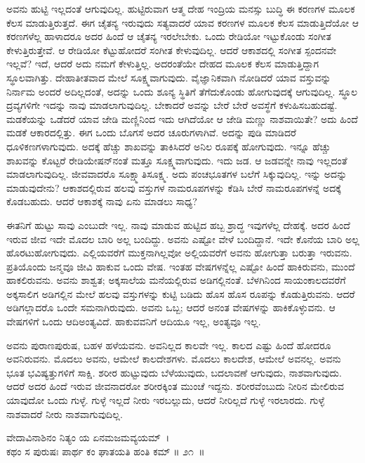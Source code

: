ಅವನು ಹುಟ್ಟಿ ಇಲ್ಲದಂತೆ ಆಗುವುದಿಲ್ಲ. ಹುಟ್ಟಿರುವಾಗ ಆತ್ಮ ದೇಹ ಇಂದ್ರಿಯ ಮನಸ್ಸು ಬುದ್ಧಿ ಈ ಕರಣಗಳ ಮೂಲಕ ಕೆಲಸ ಮಾಡುತ್ತಿರುತ್ತದೆ. ಈಗ ಚೈತನ್ಯ ಇರುವುದು ಸತ್ಯವಾದರೆ ಯಾವ ಕರಣಗಳ ಮೂಲಕ ಕೆಲಸ ಮಾಡುತ್ತಿದೆಯೋ ಆ ಕರಣಗಳೆಲ್ಲ ಹಾಳಾದರೂ ಅದರ ಹಿಂದೆ ಆ ಚೈತನ್ಯ ಇರಲೇಬೇಕು. ಒಂದು ರೇಡಿಯೋ ಇಟ್ಟುಕೊಂಡು ಸಂಗೀತ ಕೇಳುತ್ತಿರುತ್ತೇವೆ. ಆ ರೇಡಿಯೋ ಕೆಟ್ಟುಹೋದರೆ ಸಂಗೀತ ಕೇಳುವುದಿಲ್ಲ. ಆದರೆ ಆಕಾಶದಲ್ಲಿ ಸಂಗೀತ ಸ್ಪಂದನವೇ ಇಲ್ಲವೆ? ಇದೆ, ಆದರೆ ಅದು ನಮಗೆ ಕೇಳುತ್ತಿಲ್ಲ. ಅದರಂತೆಯೇ ದೇಹದ ಮೂಲಕ ಕೆಲಸ ಮಾಡುತ್ತಿದ್ದಾಗ ಸ್ಥೂಲವಾಗಿತ್ತು. ದೇಹಾತೀತವಾದ ಮೇಲೆ ಸೂಕ್ಷ್ಮವಾಗುವುದು. ವೈಜ್ಞಾನಿಕವಾಗಿ ನೋಡಿದರೆ ಯಾವ ವಸ್ತುವನ್ನು ನಿರ್ನಾಮ ಅಂದರೆ ಅದಿಲ್ಲದಂತೆ, ಅದನ್ನು ಒಂದು ಶೂನ್ಯ ಸ್ಥಿತಿಗೆ ತೆಗೆದುಕೊಂಡು ಹೋಗುವುದಕ್ಕೆ ಆಗುವುದಿಲ್ಲ. ಸ್ಥೂಲ ದ್ರವ್ಯಗಳಿಗೇ ಇದನ್ನು ನಾವು ಮಾಡಲಾಗುವುದಿಲ್ಲ. ಬೇಕಾದರೆ ಅವನ್ನು ಬೇರೆ ಬೇರೆ ಅವಸ್ಥೆಗೆ ಕಳುಹಿಸಬಹುದಷ್ಟೆ. ಮಡಕೆಯನ್ನು ಒಡೆದರೆ ಯಾವ ಜೇಡಿ ಮಣ್ಣಿನಿಂದ ಇದು ಆಗಿದೆಯೋ ಆ ಜೇಡಿ ಮಣ್ಣು ನಾಶವಾಯಿತೇ? ಅದು ಹಿಂದೆ ಮಡಕೆ ಆಕಾರದಲ್ಲಿತ್ತು. ಈಗ ಒಂದು ಬೊಗಸೆ ಅದರ ಚೂರುಗಳಾಗಿವೆ. ಅದನ್ನು ಪುಡಿ ಮಾಡಿದರೆ ಧೂಳಿಕಣಗಳಾಗುವುದು. ಅದಕ್ಕೆ ಹೆಚ್ಚು ಶಾಖವನ್ನು ತಾಕಿಸಿದರೆ ಅನಿಲ ರೂಪಕ್ಕೆ ಹೋಗುವುದು. ಇನ್ನೂ ಹೆಚ್ಚು ಶಾಖವನ್ನು ಕೊಟ್ಟರೆ ರೇಡಿಯೇಷನ್​ನಂತೆ ಮತ್ತೂ ಸೂಕ್ಷ್ಮವಾಗುವುದು. ಇದು ಜಡ. ಆ ಜಡವನ್ನೇ ನಾವು ಇಲ್ಲದಂತೆ ಮಾಡಲಾಗುವುದಿಲ್ಲ. ಜೀವವಾದರೊ ಸೂಕ್ಷ್ಮಾತಿಸೂಕ್ಷ್ಮ. ಅದು ಪಂಚಭೂತಗಳ ಬಲೆಗೆ ಸಿಕ್ಕುವುದಿಲ್ಲ. ಇನ್ನು ಅದನ್ನು ಮಾಡುವುದೇನು? ಆಕಾಶದಲ್ಲಿರುವ ಹಲವು ವಸ್ತುಗಳ ನಾಮರೂಪಗಳನ್ನು ಕೆಡಿಸಿ ಬೇರೆ ನಾಮರೂಪಗಳನ್ನೆ ಅದಕ್ಕೆ ಕೊಡಬಹುದು. ಆದರೆ ಆಕಾಶಕ್ಕೆ ನಾವು ಏನು ಮಾಡಲು ಸಾಧ್ಯ?

ಈತನಿಗೆ ಹುಟ್ಟು ಸಾವು ಎಂಬುದೇ ಇಲ್ಲ. ನಾವು ಮಾಡುವ ಹುಟ್ಟಿದ ಹಬ್ಬ ಶ್ರಾದ್ಧ ಇವುಗಳೆಲ್ಲ ದೇಹಕ್ಕೆ. ಅದರ ಹಿಂದೆ ಇರುವ ಜೀವ ಇದೇ ಮೊದಲ ಬಾರಿ ಅಲ್ಲ ಬಂದಿದ್ದು. ಅವನು ಎಷ್ಟೋ ವೇಳೆ ಬಂದಿದ್ದಾನೆ. ಇದೇ ಕೊನೆಯ ಬಾರಿ ಅಲ್ಲ ಹೊರಟುಹೋಗುವುದು. ಎಲ್ಲಿಯವರೆಗೆ ಮುಕ್ತನಾಗಿಲ್ಲವೋ ಅಲ್ಲಿಯವರೆಗೆ ಅವನು ಹೋಗುತ್ತಾ ಬರುತ್ತಾ ಇರುವನು. ಪ್ರತಿಯೊಂದು ಜನ್ಮವೂ ಜೀವಿ ಹಾಕುವ ಒಂದು ವೇಷ. ಇಂತಹ ವೇಷಗಳನ್ನೆಲ್ಲ ಎಷ್ಟೋ ಹಿಂದೆ ಹಾಕಿರುವನು, ಮುಂದೆ ಹಾಕಲಿರುವನು. ಅವನು ಶಾಶ್ವತ; ಅಕ್ಕಸಾಲೆಯ ಮನೆಯಲ್ಲಿರುವ ಅಡಿಗಲ್ಲಿನಂತೆ. ಬೆಳಗಿನಿಂದ ಸಾಯಂಕಾಲದವರೆಗೆ ಅಕ್ಕಸಾಲಿಗ ಅಡಿಗಲ್ಲಿನ ಮೇಲೆ ಹಲವು ವಸ್ತುಗಳನ್ನು ಕುಟ್ಟಿ ಬಡಿದು ಹೊಸ ಹೊಸ ರೂಪನ್ನು ಕೊಡುತ್ತಿರುವನು. ಆದರೆ ಅಡಿಗಲ್ಲಾದರೊ ಒಂದೇ ಸಮನಾಗಿರುವುದು. ಅವನು ಒಬ್ಬ; ಆದರೆ ಅನಂತ ವೇಷಗಳನ್ನು ಹಾಕಿಕೊಳ್ಳುವನು. ಆ ವೇಷಗಳಿಗೆ ಒಂದು ಆದಿ\break ಅಂತ್ಯವಿದೆ. ಹಾಕುವವನಿಗೆ ಆದಿಯೂ ಇಲ್ಲ, ಅಂತ್ಯವೂ ಇಲ್ಲ.

ಅವನು ಪುರಾಣಪುರುಷ, ಬಹಳ ಹಳೆಯವನು. ಅವನಿಲ್ಲದ ಕಾಲವೇ ಇಲ್ಲ. ಕಾಲದ ಎಷ್ಟು ಹಿಂದೆ ಹೋದರೂ ಅವನಿರುವನು. ಮೊದಲು ಅವನು, ಆಮೇಲೆ ಕಾಲದೇಶಗಳು. ಮೊದಲು ಕಾಲದೇಶ, ಆಮೇಲೆ ಅವನಲ್ಲ. ಅವನು ಭೂತ ಭವಿಷ್ಯತ್ತುಗಳಿಗೆ ಸಾಕ್ಷಿ. ಶರೀರ ಹುಟ್ಟುವುದು ಬೆಳೆಯುವುದು, ಬದಲಾವಣೆ ಆಗುವುದು, ನಾಶವಾಗುವುದು. ಆದರೆ ಅದರ ಹಿಂದೆ ಇರುವ ಜೀವನಾದರೋ ಶರೀರಕ್ಕಿಂತ ಮುಂಚೆ ಇದ್ದನು. ಶರೀರವೆಂಬುದು ನೀರಿನ ಮೇಲಿರುವ ಯಾವುದೋ ಒಂದು ಗುಳ್ಳೆ. ಗುಳ್ಳೆ ಇಲ್ಲದೆ ನೀರು ಇರಬಲ್ಲುದು, ಆದರೆ ನೀರಿಲ್ಲದೆ ಗುಳ್ಳೆ ಇರಲಾರದು. ಗುಳ್ಳೆ ನಾಶವಾದರೆ ನೀರು ನಾಶವಾಗುವುದಿಲ್ಲ.

\begin{shloka}
ವೇದಾವಿನಾಶಿನಂ ನಿತ್ಯಂ ಯ ಏನಮಜಮವ್ಯಯಮ್~।\\ಕಥಂ ಸ ಪುರುಷಃ ಪಾರ್ಥ ಕಂ ಘಾತಯತಿ ಹಂತಿ ಕಮ್ \hfill॥ ೨೧~॥
\end{shloka}


